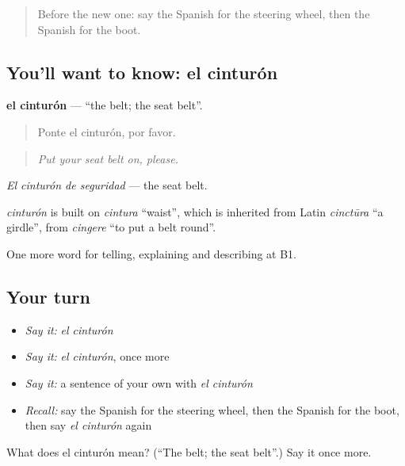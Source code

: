 \begin{quote}
Before the new one: say the Spanish for the steering wheel, then the Spanish for the boot.
\end{quote}

\subsection*{You'll want to know: el cinturón}
\textbf{el cinturón} — \textquotedblleft{}the belt; the seat belt\textquotedblright{}.

\begin{quote}
Ponte el cinturón, por favor.
\end{quote}

\begin{quote}
\emph{Put your seat belt on, please.}
\end{quote}

\emph{El cinturón de seguridad} — the seat belt.

\begin{cousinweb}
\emph{cinturón} is built on \emph{cintura} \textquotedblleft{}waist\textquotedblright{}, which is inherited from Latin \emph{cinctūra} \textquotedblleft{}a girdle\textquotedblright{}, from \emph{cingere} \textquotedblleft{}to put a belt round\textquotedblright{}.
\end{cousinweb}

\begin{grammarlens}[title={What you've built}]
One more word for telling, explaining and describing at B1.
\end{grammarlens}

\subsection*{Your turn}
\begin{itemize}
\raggedright
  \item \emph{Say it:} \emph{el cinturón}
  \item \emph{Say it:} \emph{el cinturón}, once more
  \item \emph{Say it:} a sentence of your own with \emph{el cinturón}
  \item \emph{Recall:} say the Spanish for the steering wheel, then the Spanish for the boot, then say \emph{el cinturón} again
\end{itemize}

\begin{tcolorbox}[breakable,colback=teal!4,colframe=teal!35!black,title={Before you move on}]
What does el cinturón mean? (\textquotedblleft{}The belt; the seat belt\textquotedblright{}.) Say it once more.
\end{tcolorbox}
